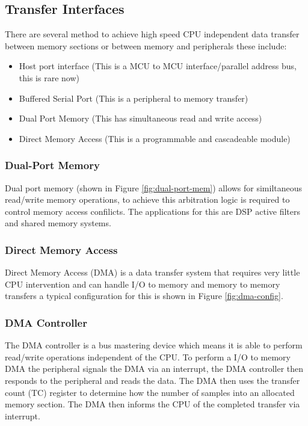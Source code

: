 

\subsection{Transfer Interfaces}
There are several method to achieve high speed CPU independent data transfer between memory sections
or between memory and peripherals these include:

\begin{itemize}
    \item Host port interface (This is a MCU to MCU interface/parallel address bus, this is rare now)
    \item Buffered Serial Port (This is a peripheral to memory transfer)
    \item Dual Port Memory (This has simultaneous read and write access)
    \item Direct Memory Access (This is a programmable and cascadeable module)
\end{itemize}

\subsubsection{Dual-Port Memory}
Dual port memory (shown in Figure \ref{fig:dual-port-mem}) allows for similtaneous read/write memory
operations, to achieve this arbitration logic is required to control memory access confilicts. The
applications for this are DSP active filters and shared memory systems.



\subsubsection{Direct Memory Access}
Direct Memory Access (DMA) is a data transfer system that requires very little CPU intervention and
can handle I/O to memory and memory to memory transfers a typical configuration for this is shown in
Figure \ref{fig:dma-config}.



\subsubsection{DMA Controller}
The DMA controller is a bus mastering device which means it is able to perform read/write operations
independent of the CPU. To perform a I/O to memory DMA the peripheral signals the DMA via an
interrupt, the DMA controller then responds to the peripheral and reads the data. The DMA then uses
the transfer count (TC) register to determine how the number of samples into an allocated memory
section. The DMA then informs the CPU of the completed transfer via interrupt.\\

